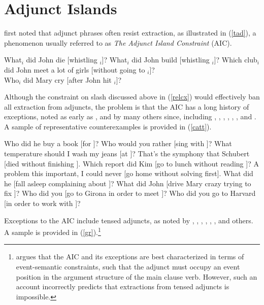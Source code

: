 \documentclass[output=paper]{langsci/langscibook}
\begin{document}
\section{Adjunct Islands}

\citet{cattell} first noted that adjunct phrases  often resist extraction, 
as illustrated in  (\ref{tad}), a phenomenon usually referred to 
as {\it The Adjunct Island Constraint} (AIC). 

\ea
\ea \bad{*}What$_i$ did John die [whistling \spc$_i$]? 
\ex \bad{*}What$_i$ did John build [whistling \spc$_i$]? 
\ex \bad{*}Which club$_i$ did John meet a lot of girls [without going to \spc$_i$]?\\
\citep[38]{cattell}
\ex \bad{*}Who$_i$ did Mary cry [after John hit \spc$_i$]?\\ 
\citep[503]{huang82}
\z  \label{tad}
\z

Although the constraint on {\sc slash} discussed above in (\ref{relcx}) would effectively ban 
all extraction from adjuncts,  the problem is that the AIC has a long history of exceptions, 
noted as early as \citet[38]{cattell}, and by many others since, including 
\citet[72]{chomsky82}, \citet{engdahl}, \citet[103]{hegarty90}, \citet{cinque}, \citet[??]{pollardsag}, 
\citet[253]{culicover87}, and \citet{borg}. A sample of representative counterexamples
is provided in (\ref{catt}). 



\ea
\ea Who did he buy a book [for \spc]?
\ex Who would you rather [sing  with \spc]?
\ex What temperature should I wash my jeans [at \spc]?
\ex That's the symphony that Schubert [died without finishing \spc].
\ex Which report did Kim [go to lunch without reading \spc]?
\ex A problem this important, I could never [go home without solving \spcs first].
\ex  What did he [fall asleep  complaining about \spc]?
\ex  What did John [drive Mary crazy trying to fix \spc]?
\ex Who did you [go to Girona in order to meet \spc]?
\ex Who did you go to Harvard [in order to work with \spc]?
\z \label{catt}
\z

 Exceptions to the AIC include  tensed adjuncts, 
as noted by \citet[88]{grosu81}, \citet[29]{deane}, \citet{kluender}, \citep[287]{levhubook},  \citet[144]{gold06},  \citet[471]{chavesextr}, \citet[175, ft.1]{truswellbook} and others. A sample is provided in (\ref{gr}).\footnote{\citet{truswellbook} argues that the AIC and its exceptions are best characterized in terms of event-semantic constraints, such that the adjunct must occupy an event position in the argument structure of the main clause verb. However, such an account incorrectly predicts that extractions from tensed adjuncts is impossible.}
\end{document}
